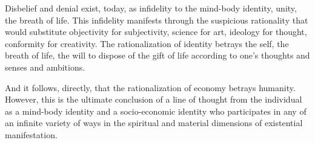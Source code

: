 

﻿Disbelief and denial exist, today, as infidelity to the mind-body
identity, unity, the breath of life.  This infidelity manifests
through the suspicious rationality that would substitute objectivity
for subjectivity, science for art, ideology for thought, conformity
for creativity.  The rationalization of identity betrays the self, the
breath of life, the will to dispose of the gift of life according to
one’s thoughts and senses and ambitions.  

And it follows, directly, that the rationalization of economy betrays
humanity.  However, this is the ultimate conclusion of a line of
thought from the individual as a mind-body identity and a
socio-economic identity who participates in any of an infinite variety
of ways in the spiritual and material dimensions of existential
manifestation.

\bye

